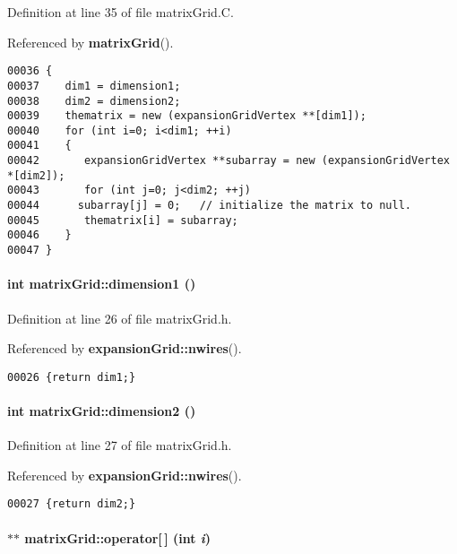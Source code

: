 Definition at line 35 of file matrix\-Grid.C.

Referenced by {\bf matrix\-Grid}().\small\begin{verbatim}00036 {
00037    dim1 = dimension1;
00038    dim2 = dimension2;
00039    thematrix = new (expansionGridVertex **[dim1]);
00040    for (int i=0; i<dim1; ++i)
00041    {
00042       expansionGridVertex **subarray = new (expansionGridVertex *[dim2]);
00043       for (int j=0; j<dim2; ++j)
00044      subarray[j] = 0;   // initialize the matrix to null.
00045       thematrix[i] = subarray;
00046    }
00047 }
\end{verbatim}\normalsize 
\label{matrixGrid_a4}
\paragraph{\setlength{\rightskip}{0pt plus 5cm}int matrix\-Grid::dimension1 ()\hspace{0.3cm}{\tt  [inline]}}\hfill



Definition at line 26 of file matrix\-Grid.h.

Referenced by {\bf expansion\-Grid::nwires}().\small\begin{verbatim}00026 {return dim1;}
\end{verbatim}\normalsize 
\label{matrixGrid_a5}
\paragraph{\setlength{\rightskip}{0pt plus 5cm}int matrix\-Grid::dimension2 ()\hspace{0.3cm}{\tt  [inline]}}\hfill



Definition at line 27 of file matrix\-Grid.h.

Referenced by {\bf expansion\-Grid::nwires}().\small\begin{verbatim}00027 {return dim2;}
\end{verbatim}\normalsize 
\label{matrixGrid_a3}
\paragraph{ $\ast$$\ast$ matrix\-Grid::operator[$\,$] (int {\em i})\hspace{0.3cm}{\tt  [inline]}}\hfill



